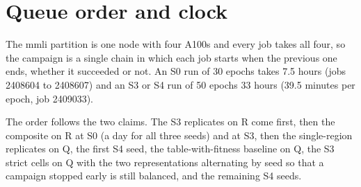 \section{Queue order and clock}
\label{sec:queue}

The mmli partition is one node with four A100s and every job takes all four, so the
campaign is a single chain in which each job starts when the previous one ends, whether it
succeeded or not. An S0 run of 30 epochs takes 7.5 hours (jobs 2408604 to 2408607) and an
S3 or S4 run of 50 epochs 33 hours (39.5 minutes per epoch, job 2409033).

The order follows the two claims. The S3 replicates on R come first, then the composite on
R at S0 (a day for all three seeds) and at S3, then the single-region replicates on Q, the
first S4 seed, the table-with-fitness baseline on Q, the S3 strict cells on Q with the two
representations alternating by seed so that a campaign stopped early is still balanced, and
the remaining S4 seeds.

\begin{table}[H]
\centering
\footnotesize
\caption{The chain as the scheduler holds it. Hours are the measured run time of the
record subset, less the elapsed time for the running job; the last column accumulates them.
Generated by \texttt{mmli\_campaign\_plan.py} from one \texttt{squeue} read.}
\label{tab:queue}

\end{table}
